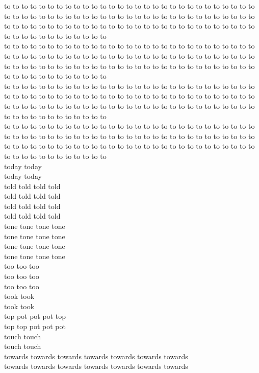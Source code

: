 to to to to to to to to to to to to to to to to to to to to to to to to to to to to to to to to to to to to to to to to to to to to to to to to to to to to to to to to to to to to to to to to to to to to to to to to to to to to to to to to to to to to to to to to to to to to to to to to to to to\\
to to to to to to to to to to to to to to to to to to to to to to to to to to to to to to to to to to to to to to to to to to to to to to to to to to to to to to to to to to to to to to to to to to to to to to to to to to to to to to to to to to to to to to to to to to to to to to to to to to to\\
to to to to to to to to to to to to to to to to to to to to to to to to to to to to to to to to to to to to to to to to to to to to to to to to to to to to to to to to to to to to to to to to to to to to to to to to to to to to to to to to to to to to to to to to to to to to to to to to to to to\\
to to to to to to to to to to to to to to to to to to to to to to to to to to to to to to to to to to to to to to to to to to to to to to to to to to to to to to to to to to to to to to to to to to to to to to to to to to to to to to to to to to to to to to to to to to to to to to to to to to to\\
today today\\
today today\\
told told told told\\
told told told told\\
told told told told\\
told told told told\\
tone tone tone tone\\
tone tone tone tone\\
tone tone tone tone\\
tone tone tone tone\\
too too too\\
too too too\\
too too too\\
took took\\
took took\\
top pot pot pot top\\
top top pot pot pot\\
touch touch\\
touch touch\\
towards towards towards towards towards towards towards\\
towards towards towards towards towards towards towards\\
